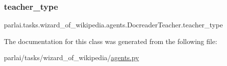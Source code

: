 \subsubsection{\texorpdfstring{teacher\+\_\+type}{teacher\_type}}
{\footnotesize\ttfamily parlai.\+tasks.\+wizard\+\_\+of\+\_\+wikipedia.\+agents.\+Docreader\+Teacher.\+teacher\+\_\+type}



The documentation for this class was generated from the following file\+:\begin{DoxyCompactItemize}
\item 
parlai/tasks/wizard\+\_\+of\+\_\+wikipedia/\hyperlink{parlai_2tasks_2wizard__of__wikipedia_2agents_8py}{agents.\+py}\end{DoxyCompactItemize}
